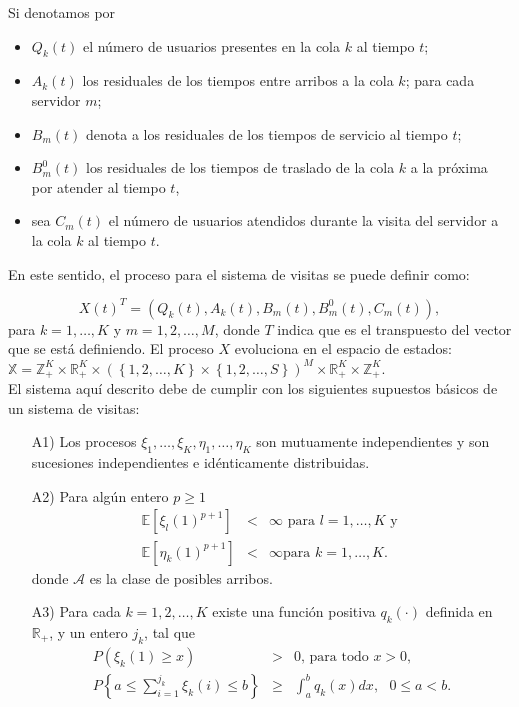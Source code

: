 \documentclass{article}
\newcommand{\ent}{\mathbb{Z}}
\newcommand{\rea}{\mathbb{R}}
\newcommand{\esp}{\mathbb{E}}
\numberwithin{equation}{section}
\begin{document}
Si denotamos por
\begin{itemize}
\item $Q_{k}\left(t\right)$ el n\'umero de usuarios presentes en
la cola $k$ al tiempo $t$; \item $A_{k}\left(t\right)$ los
residuales de los tiempos entre arribos a la cola $k$; para cada
servidor $m$; \item $B_{m}\left(t\right)$ denota a los residuales
de los tiempos de servicio al tiempo $t$; \item
$B_{m}^{0}\left(t\right)$ los residuales de los tiempos de
traslado de la cola $k$ a la pr\'oxima por atender al tiempo $t$,

\item sea
$C_{m}\left(t\right)$ el n\'umero de usuarios atendidos durante la
visita del servidor a la cola $k$ al tiempo $t$.
\end{itemize}


En este sentido, el proceso para el sistema de visitas se puede definir como:

\begin{equation}\label{Esp.Edos.Down}
X\left(t\right)^{T}=\left(Q_{k}\left(t\right),A_{k}\left(t\right),B_{m}\left(t\right),B_{m}^{0}\left(t\right),C_{m}\left(t\right)\right),
\end{equation}
para $k=1,\ldots,K$ y $m=1,2,\ldots,M$, donde $T$ indica que es el transpuesto del vector que se est\'a definiendo. El proceso $X$ evoluciona en el espacio de estados: $\mathbb{X}=\ent_{+}^{K}\times\rea_{+}^{K}\times\left(\left\{1,2,\ldots,K\right\}\times\left\{1,2,\ldots,S\right\}\right)^{M}\times\rea_{+}^{K}\times\ent_{+}^{K}$.\\

El sistema aqu\'i descrito debe de cumplir con los siguientes supuestos b\'asicos de un sistema de visitas:
\begin{itemize}
\item[A1)] Los procesos $\xi_{1},\ldots,\xi_{K},\eta_{1},\ldots,\eta_{K}$ son mutuamente independientes y son sucesiones independientes e id\'enticamente
distribuidas.

\item[A2)] Para alg\'un entero $p\geq1$
\begin{eqnarray*}
\esp\left[\xi_{l}\left(1\right)^{p+1}\right]&<&\infty\textrm{ para }l=1,\ldots,K\textrm{ y }\\
\esp\left[\eta_{k}\left(1\right)^{p+1}\right]&<&\infty\textrm{
para }k=1,\ldots,K.
\end{eqnarray*}
donde $\mathcal{A}$ es la clase de posibles arribos.

\item[A3)] Para cada $k=1,2,\ldots,K$ existe una funci\'on positiva $q_{k}\left(\cdot\right)$ definida en $\rea_{+}$, y un entero $j_{k}$, tal que
\begin{eqnarray}
P\left(\xi_{k}\left(1\right)\geq x\right)&>&0\textrm{, para todo }x>0,\\
P\left\{a\leq\sum_{i=1}^{j_{k}}\xi_{k}\left(i\right)\leq
b\right\}&\geq&\int_{a}^{b}q_{k}\left(x\right)dx, \textrm{ }0\leq
a<b.
\end{eqnarray}
\end{itemize}
\end{document}
